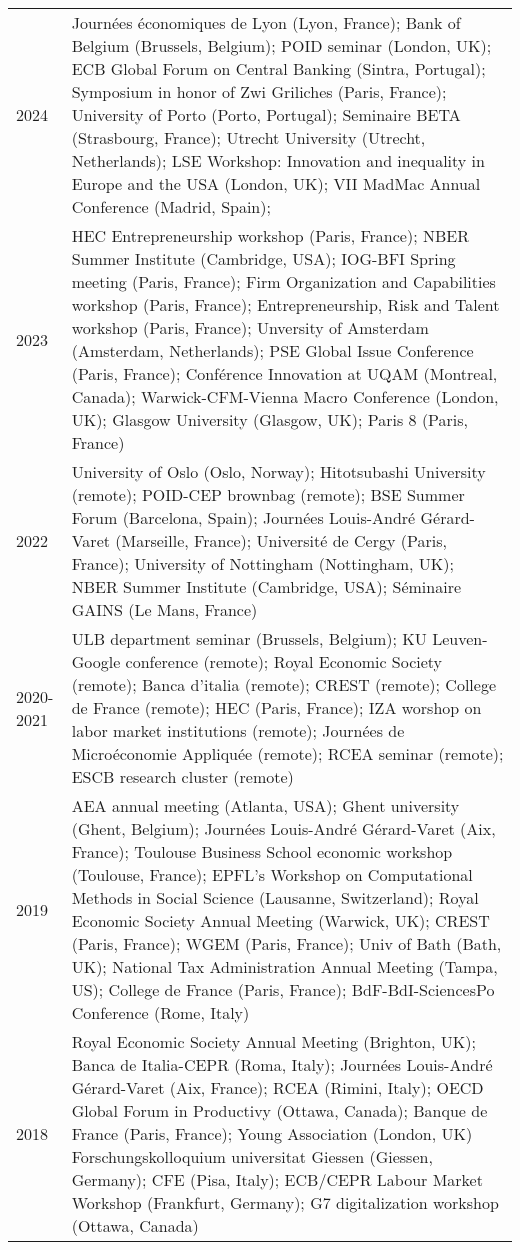 \documentclass[12pt]{article}
\begin{document}
\begin{footnotesize}
\begin{tabular}{p{1cm}p{13cm}}
2024 & Journées économiques de Lyon (Lyon, France); Bank of Belgium (Brussels, Belgium); POID seminar (London, UK); ECB Global Forum on Central Banking (Sintra, Portugal); Symposium in honor of Zwi Griliches (Paris, France);  University of Porto (Porto, Portugal); Seminaire BETA (Strasbourg, France); Utrecht University (Utrecht, Netherlands); LSE Workshop: Innovation and inequality in Europe and the USA (London, UK); VII MadMac Annual Conference (Madrid, Spain); \\
2023 & HEC Entrepreneurship workshop (Paris, France); NBER Summer Institute (Cambridge, USA); IOG-BFI Spring meeting (Paris, France); Firm Organization and Capabilities workshop (Paris, France); Entrepreneurship, Risk and Talent workshop (Paris, France); Unversity of Amsterdam (Amsterdam, Netherlands); PSE Global Issue Conference (Paris, France); Conférence Innovation at UQAM (Montreal, Canada); Warwick-CFM-Vienna Macro Conference (London, UK); Glasgow University (Glasgow, UK); Paris 8 (Paris, France) \\
2022 & University of Oslo (Oslo, Norway); Hitotsubashi University (remote); POID-CEP brownbag (remote); BSE Summer Forum (Barcelona, Spain); Journées Louis-André Gérard-Varet (Marseille, France); Université de Cergy (Paris, France); University of Nottingham (Nottingham, UK); NBER Summer Institute (Cambridge, USA); Séminaire GAINS (Le Mans, France) \\ 
 2020-2021 &  ULB department seminar (Brussels, Belgium); KU Leuven-Google conference (remote);  Royal Economic Society (remote); Banca d'italia (remote); CREST (remote); College de France (remote); HEC (Paris, France); IZA worshop on labor market institutions (remote); Journées de Microéconomie Appliquée (remote); RCEA seminar (remote); ESCB research cluster (remote) \\
 2019 & AEA annual meeting (Atlanta, USA); Ghent university (Ghent, Belgium); Journées Louis-André Gérard-Varet (Aix, France); Toulouse Business School economic workshop (Toulouse, France); EPFL's Workshop on Computational Methods in Social Science (Lausanne, Switzerland); Royal Economic Society Annual Meeting (Warwick, UK); CREST (Paris, France); WGEM (Paris, France); Univ of Bath (Bath, UK); National Tax Administration Annual Meeting (Tampa, US); College de France (Paris, France); BdF-BdI-SciencesPo Conference (Rome, Italy) \\ 
 2018 &  Royal Economic Society Annual Meeting (Brighton, UK); Banca de Italia-CEPR (Roma, Italy); Journées Louis-André Gérard-Varet (Aix, France); RCEA (Rimini, Italy); OECD Global Forum in Productivy (Ottawa, Canada); Banque de France (Paris, France); Young Association (London, UK)  Forschungskolloquium universitat Giessen (Giessen, Germany);  CFE (Pisa, Italy); ECB/CEPR Labour Market Workshop (Frankfurt, Germany); G7 digitalization workshop (Ottawa, Canada)\\

\end{tabular}
\end{footnotesize}
\end{document}
